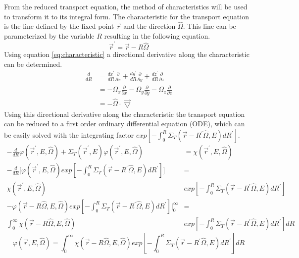 From the reduced transport equation, the method of characteristics will be 
used to transform it to its integral form. The characteristic for the transport 
equation is the line defined by the fixed point $\vec{r}$ and the direction 
$\hat{\Omega}$. This line can be parameterized by the variable $R$ resulting in 
the following equation. 
\begin{equation}
  \vec{r}^{'} = \vec{r} - R\hat{\Omega}
  \label{eq:characteristic}
\end{equation}
Using equation \ref{eq:characteristic} a directional derivative along the
characteristic can be determined.
\begin{align}
  \frac{d}{dR} & = \frac{dx^{'}}{dR}\frac{\partial}{\partial x} +
  \frac{dy^{'}}{dR}\frac{\partial}{\partial y} +
  \frac{dz^{'}}{dR}\frac{\partial}{\partial z} \nonumber \\
  & = -\Omega_x \frac{\partial}{\partial x} -
  \Omega_y \frac{\partial}{\partial y} -
  \Omega_z \frac{\partial}{\partial z} \nonumber \\
  & = -\hat{\Omega} \cdot \vec{\bigtriangledown}
\end{align}
Using this directional derivative along the characteristic the transport 
equation can be reduced to a first order ordinary differential equation (ODE), 
which can be easily solved with the integrating factor
$exp\left[-\int_0^R \Sigma_T(\vec{r}-R^{'}\hat{\Omega},E)dR^{'} \right]$.
\begin{align}
  -\frac{d}{dR}\varphi(\vec{r}^{'},E,\hat{\Omega}) + \Sigma_T(\vec{r}^{'},E)
  \varphi(\vec{r}^{'},E,\hat{\Omega}) & =
  \chi(\vec{r}^{'},E,\hat{\Omega}) \nonumber \\
  -\frac{d}{dR}\bigg[\varphi(\vec{r}^{'},E,\hat{\Omega})
      exp\left[-\int_0^R \Sigma_T(\vec{r}-R^{'}\hat{\Omega},E)dR^{'}\right]
      \bigg] & = \nonumber \\
  \chi(\vec{r}^{'},E,\hat{\Omega})
  &exp\left[-\int_0^R \Sigma_T(\vec{r}-R^{'}\hat{\Omega},E)dR^{'} \right]
    \nonumber \\
    -\varphi(\vec{r} - R\hat{\Omega},E,\hat{\Omega})
    exp\left[-\int_0^R \Sigma_T(\vec{r}-R^{'}\hat{\Omega},E)dR^{'}\right] 
    \bigg|_0^{\infty} & = \nonumber \\
    \int_0^{\infty} 
    \chi(\vec{r} - R\hat{\Omega},E,\hat{\Omega})
    &exp\left[-\int_0^R \Sigma_T(\vec{r}-R^{'}\hat{\Omega},E)dR^{'} \right] dR
    \nonumber 
\end{align}
\begin{equation}
    \varphi(\vec{r},E,\hat{\Omega}) = 
    \int_0^{\infty} \chi(\vec{r} - R\hat{\Omega},E,\hat{\Omega})
    exp\left[-\int_0^R \Sigma_T(\vec{r}-R^{'}\hat{\Omega},E)dR^{'} \right] dR
  \label{eq:line_integral_transport_eqn}
\end{equation}
